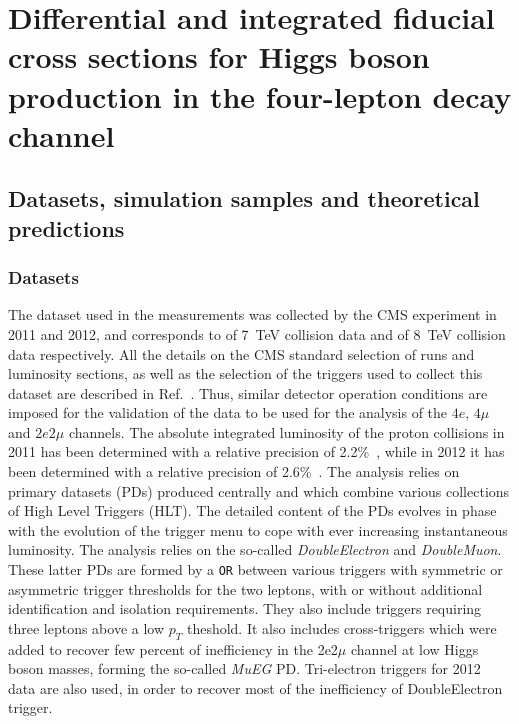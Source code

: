 \chapter{Differential and integrated fiducial cross sections for Higgs boson production in the four-lepton decay channel}\label{Chapter4}

\section{Datasets, simulation samples and theoretical predictions}\label{sec:DatasetsSimulation}
\subsection{Datasets}\label{sec:Datasets}
The dataset used in the measurements was collected by the CMS experiment in 2011 and 2012, and corresponds to \usedLumiA of 7~TeV collision data
and \usedLumiB of 8~TeV collision data respectively. All the details on the CMS standard selection of runs and luminosity sections, as well as the
selection of the triggers used to collect this dataset are described in Ref.~\cite{Chatrchyan:2013mxa}. Thus, similar detector operation conditions are 
imposed for the validation of the data to be used for the analysis of the $4e$, $4\mu$ and $2e2\mu$ channels. The absolute integrated luminosity of the
proton collisions in 2011 has been determined with a relative precision of 2.2\%~\cite{CMS:2011vpa}, while in 2012 it has been determined with a relative
precision of 2.6\%~\cite{CMS-PAS-LUM-13-001}. The analysis relies on primary datasets (PDs) produced centrally and which combine various collections of 
High Level Triggers (HLT).  The detailed content of the PDs evolves in phase with the evolution of the trigger menu to cope with ever increasing
instantaneous luminosity. The analysis relies on the so-called {\it DoubleElectron} and {\it DoubleMuon}. These latter PDs are formed by a {\tt OR} between
various triggers with symmetric or asymmetric trigger thresholds for the two leptons, with or without additional identification and isolation 
requirements. They also include triggers requiring three leptons above a low $p_T$ theshold.  It also includes cross-triggers which were added to
recover few percent of inefficiency in the 2e2$\mu$ channel at low Higgs boson masses, forming the so-called {\it MuEG} PD.  Tri-electron triggers for 2012
data are also used, in order to recover most of the inefficiency of DoubleElectron trigger.
